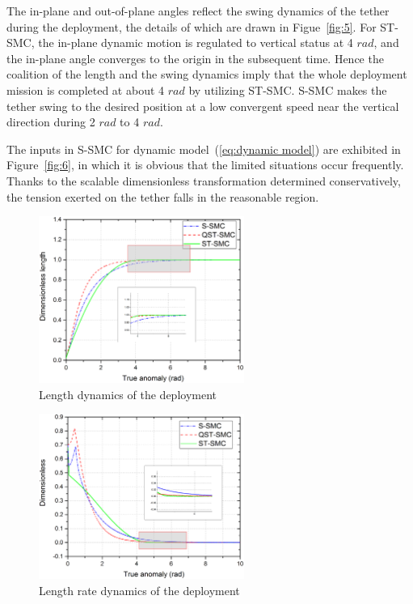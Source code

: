 \documentclass[3p]{elsarticle}
\theoremstyle{plain}
\theoremstyle{remark}
\begin{document}
The in-plane and out-of-plane angles reflect the swing dynamics of the tether during the deployment, the details of which are drawn in Figue~\ref{fig:5}. For ST-SMC, the in-plane dynamic motion is regulated to vertical status at 4 $rad$, and the in-plane angle converges to the origin in the subsequent time. Hence the coalition of the length and the swing dynamics imply that the whole deployment mission is completed at about 4 $rad$ by utilizing ST-SMC. S-SMC makes the tether swing to the desired position at a low convergent speed near the vertical direction during 2 $rad$ to 4 $rad$.\par
The inputs in S-SMC for dynamic model~(\ref{eq:dynamic model}) are exhibited in Figure~\ref{fig:6}, in which it is obvious that the limited situations occur frequently. Thanks to the scalable dimensionless transformation determined conservatively, the tension exerted on the tether falls in the reasonable region.\par
\begin{figure}
\centering
\includegraphics[width=0.6\textwidth]{paper4_fig3.eps}
\caption{Length dynamics of the deployment}
\label{fig:3}
\end{figure}
\begin{figure}
\centering
\includegraphics[width=0.6\textwidth]{paper4_fig4.eps}
\caption{Length rate dynamics of the deployment}
\label{fig:4}
\end{figure}
\end{document}
